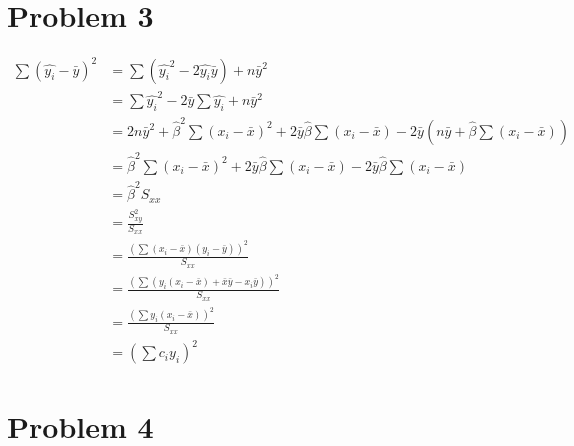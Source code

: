 \documentclass{article}
\begin{document}
\section*{Problem 3}

\begin{align*}
	\sum (\widehat{y_i} - \bar{y})^2
	&= \sum (\widehat{y_i}^2 - 2 \widehat{y_i}\bar{y}) + n\bar{y}^2\\
	&= \sum \widehat{y_i}^2
	- 2 \bar{y} \sum \widehat{y_i}
	+ n\bar{y}^2 \\
	&= 2 n \bar{y}^2
	+ \widehat{\beta}^2 \sum (x_i - \bar{x})^2
	+ 2 \bar{y}\widehat{\beta} \sum (x_i - \bar{x})
	- 2 \bar{y} (n\bar{y} + \widehat{\beta} \sum (x_i - \bar{x})) \\
	&= \widehat{\beta}^2 \sum (x_i - \bar{x})^2
	+ 2 \bar{y}\widehat{\beta} \sum (x_i - \bar{x}) - 2 \bar{y} \widehat{\beta} \sum (x_i - \bar{x}) \\
	&= \boxed{\widehat{\beta}^2 S_{xx}} \\
	&= \frac{S_{xy}^2}{S_{xx}} \\
	&= \frac{(\sum (x_i - \bar{x})(y_i - \bar{y}))^2}{S_{xx}} \\
	&= \frac
		{(\sum (y_i (x_i-\bar{x}) + \bar{x}\bar{y} - x_i \bar{y}))^2}
		{S_{xx}} \\
	&= \frac
		{(\sum y_i (x_i-\bar{x}))^2}
		{S_{xx}} \\
	&= \boxed{\left(\sum c_i y_i\right)^2}
\end{align*}

\section*{Problem 4}
\end{document}
